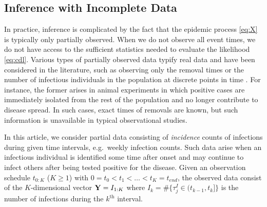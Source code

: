 \documentclass[11pt]{article}
\begin{document}
	
	
	
	\subsection{Inference with Incomplete Data}
	\label{sec:iid}
	
	
	In practice, inference is complicated by the fact that the epidemic process \eqref{eq:X} is typically only partially observed. When we do not observe all event times, we do not have access to the sufficient statistics needed to evaluate the likelihood \eqref{eq:cdl}. Various types of partially observed data typify real data and have been considered in the literature, such as observing only the removal times \cite{Gibson.1998, ONeill.1999} or the number of infectious individuals in the population at discrete points in time \cite{Fintzi.2017}. For instance, the former arises in animal experiments in which positive cases are immediately isolated from the rest of the population and no longer contribute to disease spread. In such cases, exact times of removals are known, but such information is unavailable in typical observational studies.
	
	In this article, we consider partial data consisting of \textit{incidence} counts of infections during given time intervals, e.g.\ weekly infection counts. Such data arise when an infectious individual is identified some time after onset and may continue to infect others after being tested positive for the disease. %
	Given an observation schedule $t_{0:K}$ ($K \ge 1$) with $0 = t_0 < t_1 < \dots < t_K = t_{end}$, the observed data consist of the $K$-dimensional vector $\mathbf{Y} = I_{1:K}$ where $I_k = \#\{\tau^I_j \in (t_{k-1}, t_k]\}$ is the number of infections during the $k^{\text{th}}$ interval.
	
\end{document}
